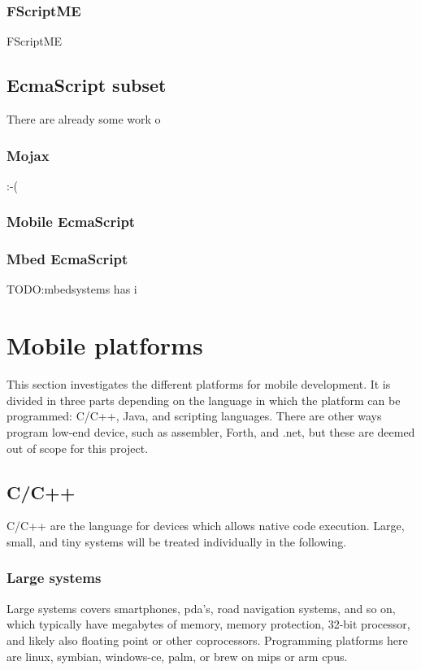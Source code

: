 \subsubsection{FScriptME}
FScriptME

\subsection{EcmaScript subset}
There are already some work o
\subsubsection{Mojax}
:-(
\subsubsection{Mobile EcmaScript}
\subsubsection{Mbed EcmaScript}
TODO:mbedsystems has i

\section{Mobile platforms}

This section investigates the different platforms for mobile development. 
It is divided in three parts depending on the language in which the platform can be programmed:
C/C++, Java, and scripting languages.
There are other ways program low-end device, such as assembler, Forth, and .net, but these are deemed out of scope for this project.


\subsection{C/C++}
C/C++ are the language for devices which allows native code execution.
Large, small, and tiny systems will be treated individually in the following.

\subsubsection{Large systems}
Large systems covers smartphones, pda's, road navigation systems, and so on, which typically have megabytes of memory, memory protection, 32-bit processor, and likely also floating point or other coprocessors. Programming platforms here are linux, symbian, windows-ce, palm, or brew on mips or arm cpus. 

